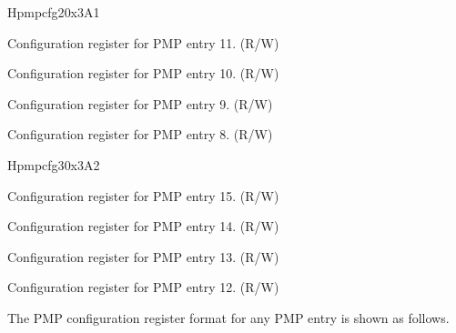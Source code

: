 \begin{register}{H}{pmpcfg2}{0x3A1}
\label{regdesc:pmpcfg2}%
%
%
%
%
\regnewline%
\begin{regdesc}
\begin{reglist}
\label{fielddesc:pmp11cfg}\item [pmp11cfg] Configuration register for PMP entry 11. (R/W)
\label{fielddesc:pmp10cfg}\item [pmp10cfg] Configuration register for PMP entry 10. (R/W)
\label{fielddesc:pmp9cfg}\item [pmp9cfg] Configuration register for PMP entry 9. (R/W)
\label{fielddesc:pmp8cfg}\item [pmp8cfg] Configuration register for PMP entry 8. (R/W)
\end{reglist}
\end{regdesc}
\end{register}
\begin{register}{H}{pmpcfg3}{0x3A2}
\label{regdesc:pmpcfg3}%
%
%
%
%
\regnewline%
\begin{regdesc}
\begin{reglist}
\label{fielddesc:pmp15cfg}\item [pmp15cfg] Configuration register for PMP entry 15. (R/W)
\label{fielddesc:pmp14cfg}\item [pmp14cfg] Configuration register for PMP entry 14. (R/W)
\label{fielddesc:pmp13cfg}\item [pmp13cfg] Configuration register for PMP entry 13. (R/W)
\label{fielddesc:pmp12cfg}\item [pmp12cfg] Configuration register for PMP entry 12. (R/W)
\end{reglist}
\end{regdesc}
\end{register}

The PMP configuration register format for any PMP entry is shown as follows.


